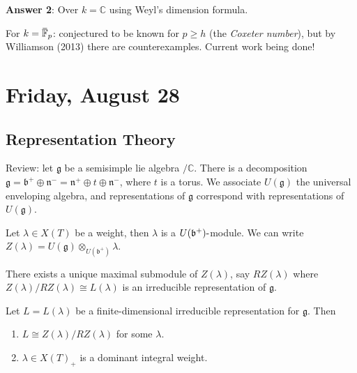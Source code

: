 \textbf{Answer 2}: Over \(k={\mathbb{C}}\) using Weyl's dimension
formula.

For
\(k = \mkern 1.5mu\overline{\mkern-1.5mu{\mathbb{F}}\mkern-1.5mu}\mkern 1.5mu_p\):
conjectured to be known for \(p\geq h\) (the \emph{Coxeter number}), but
by Williamson (2013) there are counterexamples. Current work being done!

\hypertarget{friday-august-28}{%
\section{Friday, August 28}\label{friday-august-28}}

\hypertarget{representation-theory}{%
\subsection{Representation Theory}\label{representation-theory}}

Review: let \({\mathfrak{g}}\) be a semisimple lie algebra
\(/{\mathbb{C}}\). There is a decomposition
\({\mathfrak{g}}= {\mathfrak{b}}^+ \oplus {\mathfrak{n}}^- = {\mathfrak{n}}^+ \oplus t\oplus {\mathfrak{n}}^-\),
where \(t\) is a torus. We associate \(U({\mathfrak{g}})\) the universal
enveloping algebra, and representations of \({\mathfrak{g}}\) correspond
with representations of \(U({\mathfrak{g}})\).

Let \(\lambda \in X(T)\) be a weight, then \(\lambda\) is a
\(U({\mathfrak{b}}^+){\hbox{-}}\)module. We can write
\(Z(\lambda) = U({\mathfrak{g}}) \otimes_{U({\mathfrak{b}}^+)} \lambda\).

\begin{remark}

There exists a unique maximal submodule of \(Z(\lambda)\), say
\(RZ(\lambda)\) where \(Z(\lambda)/RZ(\lambda) \cong L(\lambda)\) is an
irreducible representation of \({\mathfrak{g}}\).

\end{remark}

\begin{theorem}[?]

Let \(L = L(\lambda)\) be a finite-dimensional irreducible
representation for \({\mathfrak{g}}\). Then

\begin{enumerate}
\def\labelenumi{\arabic{enumi}.}
\tightlist
\item
  \(L \cong Z(\lambda)/RZ(\lambda)\) for some \(\lambda\).
\item
  \(\lambda \in X(T)_+\) is a dominant integral weight.
\end{enumerate}

\end{theorem}

